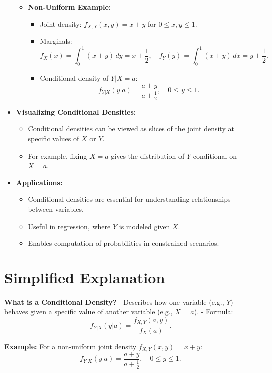 \documentclass{article}
\begin{document}
\begin{itemize}
\begin{itemize}
      \item \textbf{Non-Uniform Example:}
        \begin{itemize}
          \item Joint density: $f_{X,Y}(x,y) = x + y$ for $0 \leq x, y \leq 1$.
          \item Marginals:
            \[
              f_X(x) = \int_0^1 (x + y) \, dy = x + \frac{1}{2}, \quad f_Y(y) = \int_0^1 (x + y) \, dx = y + \frac{1}{2}.
            \]
          \item Conditional density of $Y|X = a$:
            \[
              f_{Y|X}(y|a) = \frac{a + y}{a + \frac{1}{2}}, \quad 0 \leq y \leq 1.
            \]
        \end{itemize}
    \end{itemize}

  \item \textbf{Visualizing Conditional Densities:}
    \begin{itemize}
      \item Conditional densities can be viewed as slices of the joint density at specific values of $X$ or $Y$.
      \item For example, fixing $X = a$ gives the distribution of $Y$ conditional on $X = a$.
    \end{itemize}

  \item \textbf{Applications:}
    \begin{itemize}
      \item Conditional densities are essential for understanding relationships between variables.
      \item Useful in regression, where $Y$ is modeled given $X$.
      \item Enables computation of probabilities in constrained scenarios.
    \end{itemize}
\end{itemize}

\section*{Simplified Explanation}

\textbf{What is a Conditional Density?}
- Describes how one variable (e.g., $Y$) behaves given a specific value of another variable (e.g., $X = a$).
- Formula:
\[
  f_{Y|X}(y|a) = \frac{f_{X,Y}(a, y)}{f_X(a)}.
\]

\textbf{Example:}
For a non-uniform joint density $f_{X,Y}(x,y) = x + y$:
\[
  f_{Y|X}(y|a) = \frac{a + y}{a + \frac{1}{2}}, \quad 0 \leq y \leq 1.
\]
\end{document}
